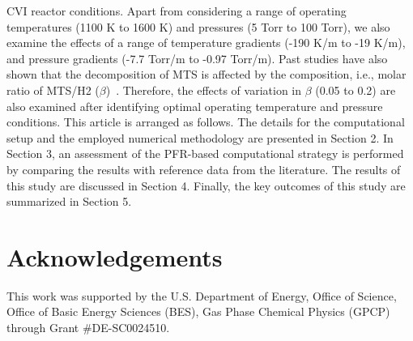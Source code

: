 \documentclass[final, letterpaper, square, comma, numbers, sort&compress]{elsarticle}
\begin{document}
CVI reactor conditions. Apart from considering a range of operating temperatures (1100 K to 1600 K) and
pressures (5 Torr to 100 Torr), we also examine the effects of a range of temperature gradients (-190 K/m
to -19 K/m), and pressure gradients (-7.7 Torr/m to -0.97 Torr/m). Past studies have also shown that the
decomposition of MTS is affected by the composition, i.e., molar ratio of MTS/H2 ($\beta$)~\cite{Peng2021}. Therefore, the effects of variation in $\beta$ (0.05 to 0.2) are also examined after identifying optimal operating temperature and pressure conditions. This article is arranged as follows. The details for the computational setup and the employed numerical methodology are presented in Section 2. In Section 3, an assessment of the PFR-based computational strategy is performed by comparing the results with reference data from the literature. The results of this study are discussed in Section 4. Finally, the key outcomes of this study are summarized in Section 5.


\section*{Acknowledgements}
This work was supported by the U.S. Department of Energy, Office of Science, Office of Basic Energy Sciences (BES), Gas Phase Chemical Physics (GPCP) through Grant \#DE-SC0024510.



\end{document}
